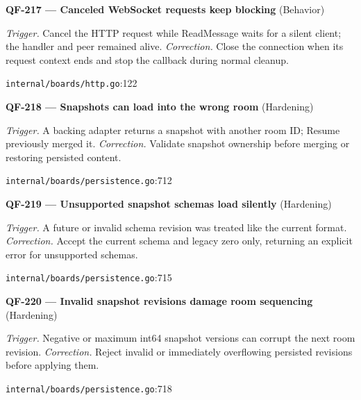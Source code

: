 \begin{minipage}{\linewidth}
\textbf{QF-217 --- Canceled WebSocket requests keep blocking} {\scriptsize\color{accent}(Behavior)}\par
\textit{Trigger.} Cancel the HTTP request while ReadMessage waits for a silent client; the handler and peer remained alive. \textit{Correction.} Close the connection when its request context ends and stop the callback during normal cleanup.\par
{\scriptsize\color{muted}\nolinkurl{internal/boards/http.go}:122}\par
\end{minipage}\par\vspace{7pt}
\begin{minipage}{\linewidth}
\textbf{QF-218 --- Snapshots can load into the wrong room} {\scriptsize\color{accent}(Hardening)}\par
\textit{Trigger.} A backing adapter returns a snapshot with another room ID; Resume previously merged it. \textit{Correction.} Validate snapshot ownership before merging or restoring persisted content.\par
{\scriptsize\color{muted}\nolinkurl{internal/boards/persistence.go}:712}\par
\end{minipage}\par\vspace{7pt}
\begin{minipage}{\linewidth}
\textbf{QF-219 --- Unsupported snapshot schemas load silently} {\scriptsize\color{accent}(Hardening)}\par
\textit{Trigger.} A future or invalid schema revision was treated like the current format. \textit{Correction.} Accept the current schema and legacy zero only, returning an explicit error for unsupported schemas.\par
{\scriptsize\color{muted}\nolinkurl{internal/boards/persistence.go}:715}\par
\end{minipage}\par\vspace{7pt}
\begin{minipage}{\linewidth}
\textbf{QF-220 --- Invalid snapshot revisions damage room sequencing} {\scriptsize\color{accent}(Hardening)}\par
\textit{Trigger.} Negative or maximum int64 snapshot versions can corrupt the next room revision. \textit{Correction.} Reject invalid or immediately overflowing persisted revisions before applying them.\par
{\scriptsize\color{muted}\nolinkurl{internal/boards/persistence.go}:718}\par
\end{minipage}\par\vspace{7pt}
